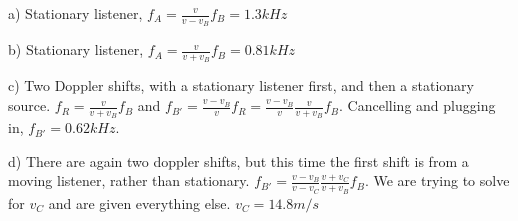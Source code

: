 \documentclass[10pt]{article}
\newenvironment{problem}[2][Problem]{\begin{trivlist}
\item[\hskip \labelsep {\bfseries #1}\hskip \labelsep {\bfseries #2.}]}{\end{trivlist}}
\begin{document}
\begin{problem}{5}
\item a) Stationary listener, $f_A=\frac{v}{v-v_B}f_B=1.3kHz$
\item b) Stationary listener, $f_A=\frac{v}{v+v_B}f_B=0.81kHz$
\item c) Two Doppler shifts, with a stationary listener first, and then a stationary source. $f_R=\frac{v}{v+v_B}f_B$ and $f_{B'}=\frac{v-v_B}{v}f_R=\frac{v-v_B}{v}\frac{v}{v+v_B}f_B$. Cancelling and plugging in, $f_{B'}=0.62kHz$.
\item d) There are again two doppler shifts, but this time the first shift is from a moving listener, rather than stationary. $f_{B'}=\frac{v-v_B}{v-v_C}\frac{v+v_C}{v+v_B}f_B$. We are trying to solve for $v_C$ and are given everything else. $v_C=14.8m/s$
\end{problem}



\end{document}

